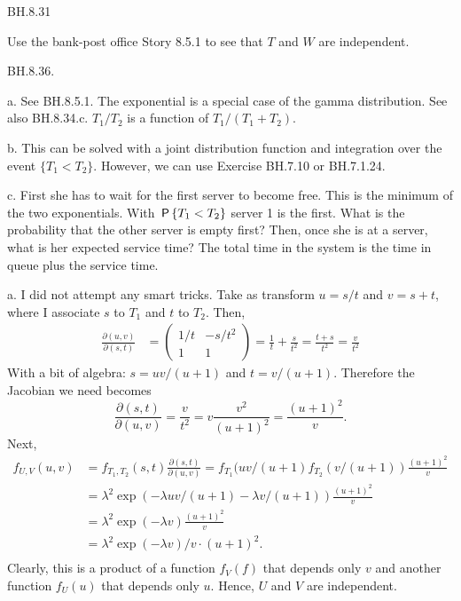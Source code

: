 \begin{exercise}
BH.8.31
\begin{hint}
Use the bank-post office Story 8.5.1 to see that $T$ and $W$ are independent.
\end{hint}
\end{exercise}


\begin{exercise}
BH.8.36.
\begin{hint}
a. See BH.8.5.1. The exponential is a special case of the gamma distribution. See also BH.8.34.c. $T_1/T_2$ is a function of $T_1/(T_1+T_2)$.

b. This can be solved with a joint distribution function and integration over the event $\{T_1<T_2\}$. However, we can use Exercise BH.7.10 or BH.7.1.24.

c. First she has to wait for the first server to become free. This is the minimum of the two exponentials.
With $\P{T_1<T_2}$ server 1 is the first.
What is the probability that the other server is empty first? Then, once she is at a server, what is her expected service time? The total time in the system is the time in queue plus the service time.
\end{hint}
\begin{solution}
a. I did not attempt any smart tricks. Take as transform $u=s/t$ and $v=s+t$, where I associate $s$ to $T_{1}$ and $t$  to $T_2$. Then,
\begin{align*}
\frac{\partial (u,v)}{\partial (s,t)} &=
  \begin{pmatrix}
    1/t & -s/t^{2} \\
1 & 1
  \end{pmatrix} = \frac 1 t + \frac{s}{t^{2}} = \frac{t+s}{t^{2}} = \frac{v}{t^{2}}
\end{align*}
With a bit of algebra: $s=uv/(u+1)$ and $t=v/(u+1)$.
Therefore the Jacobian we need becomes
\begin{equation}
\label{eq:12}
\frac{\partial (s,t)}{\partial (u,v)} = \frac{v}{t^{2}} = v \frac{v^2}{(u+1)^2} = \frac{(u+1)^{2}}{v}.
\end{equation}
Next,
\begin{align*}
  f_{U, V}(u,v) &= f_{T_1,T_2}(s,t) \frac{\partial (s,t)}{\partial (u,v)}
  =  f_{T_1}(uv/(u+1) f_{T_2}(v/(u+1)) \frac{(u+1)^{2}}{v} \\
  &=  \lambda^{2} \exp(-\lambda uv/(u+1) - \lambda v/(u+1)) \frac{(u+1)^{2}}{v} \\
  &=  \lambda^{2} \exp(-\lambda v) \frac{(u+1)^{2}}{v} \\
  &=  \lambda^{2} \exp(-\lambda v)/v \cdot  (u+1)^{2}. \\
\end{align*}
Clearly, this is a product of a function $f_{V}(f)$ that depends only  $v$ and another function $f_U(u)$ that depends  only $u$. Hence, $U$ and $V$ are independent.


\end{solution}
\end{exercise}
